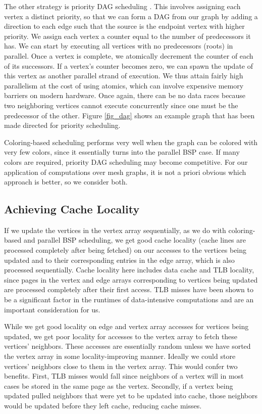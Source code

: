 \documentclass[journal]{IEEEtran}
\begin{document}
The other strategy is priority DAG scheduling \cite{dag}. This involves assigning each vertex a distinct priority, so that we can form a DAG from our graph by adding a direction to each edge such that the source is the endpoint vertex with higher priority. We assign each vertex a counter equal to the number of predecessors it has. We can start by executing all vertices with no predecessors (roots) in parallel. Once a vertex is complete, we atomically decrement the counter of each of its successors. If a vertex's counter becomes zero, we can spawn the update of this vertex as another parallel strand of execution. We thus attain fairly high parallelism at the cost of using atomics, which can involve expensive memory barriers on modern hardware. Once again, there can be no data races because two neighboring vertices cannot execute concurrently since one must be the predecessor of the other. Figure \ref{fig_dag} shows an example graph that has been made directed for priority scheduling.

Coloring-based scheduling performs very well when the graph can be colored with very few colors, since it essentially turns into the parallel BSP case. If many colors are required, priority DAG scheduling may become competitive. For our application of computations over mesh graphs, it is not a priori obvious which approach is better, so we consider both.

\subsection{Achieving Cache Locality}
If we update the vertices in the vertex array sequentially, as we do with coloring-based and parallel BSP scheduling, we get good cache locality (cache lines are processed completely after being fetched) on our accesses to the vertices being updated and to their corresponding entries in the edge array, which is also processed sequentially. Cache locality here includes data cache and TLB locality, since pages in the vertex and edge arrays corresponding to vertices being updated are processed completely after their first access. TLB misses have been shown \cite{tlb} to be a significant factor in the runtimes of data-intensive computations and are an important consideration for us.

While we get good locality on edge and vertex array accesses for vertices being updated, we get poor locality for accesses to the vertex array to fetch these vertices' neighbors. These accesses are essentially random unless we have sorted the vertex array in some locality-improving manner. Ideally we could store vertices' neighbors close to them in the vertex array. This would confer two benefits. First, TLB misses would fall since neighbors of a vertex will in most cases be stored in the same page as the vertex. Secondly, if a vertex being updated pulled neighbors that were yet to be updated into cache, those neighbors would be updated before they left cache, reducing cache misses.
\end{document}
